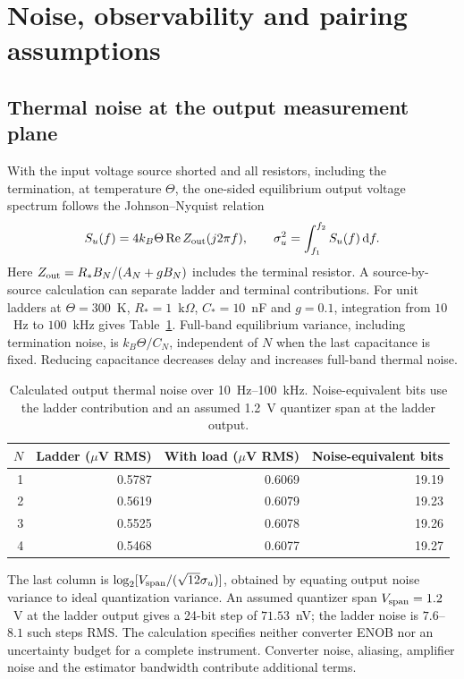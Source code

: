 \section{Noise, observability and pairing assumptions}
\label{sec:noise-pairing}

\subsection{Thermal noise at the output measurement plane}

With the input voltage source shorted and all resistors, including the termination, at temperature $\Theta$, the one-sided equilibrium output voltage spectrum follows the Johnson--Nyquist relation \citep{johnson1928thermal,nyquist1928thermal}
\begin{equation}\label{eq:thermal-noise}
S_{u}(f)=4k_B\Theta\,\mathrm{Re}\,Z_{\rm out}(j2\pi f),\qquad
\sigma_u^2=\int_{f_1}^{f_2}S_u(f)\,\mathrm df.
\end{equation}
Here $Z_{\rm out}=R_*B_N/(A_N+gB_N)$ includes the terminal resistor. A source-by-source calculation can separate ladder and terminal contributions. For unit ladders at $\Theta=300$~K, $R_*=1$~k$\Omega$, $C_*=10$~nF and $g=0.1$, integration from $10$~Hz to $100$~kHz gives Table~\ref{tab:noise}. Full-band equilibrium variance, including termination noise, is $k_B\Theta/C_N$, independent of $N$ when the last capacitance is fixed. Reducing capacitance decreases delay and increases full-band thermal noise.

\begin{table}[htbp]
\centering
\caption{Calculated output thermal noise over 10~Hz--100~kHz. Noise-equivalent bits use the ladder contribution and an assumed 1.2~V quantizer span at the ladder output.}
\label{tab:noise}
\begin{tabular}{rrrr}
\toprule
$N$ & Ladder ($\mu$V RMS) & With load ($\mu$V RMS) & Noise-equivalent bits \\
\midrule
1 & 0.5787 & 0.6069 & 19.19 \\
2 & 0.5619 & 0.6079 & 19.23 \\
3 & 0.5525 & 0.6078 & 19.26 \\
4 & 0.5468 & 0.6077 & 19.27 \\
\bottomrule
\end{tabular}
\end{table}

The last column is $\log_2[V_{\rm span}/(\sqrt{12}\sigma_u)]$, obtained by equating output noise variance to ideal quantization variance. An assumed quantizer span $V_{\rm span}=1.2$~V at the ladder output gives a 24-bit step of $71.53$~nV; the ladder noise is $7.6$--$8.1$ such steps RMS. The calculation specifies neither converter ENOB nor an uncertainty budget for a complete instrument. Converter noise, aliasing, amplifier noise and the estimator bandwidth contribute additional terms.

